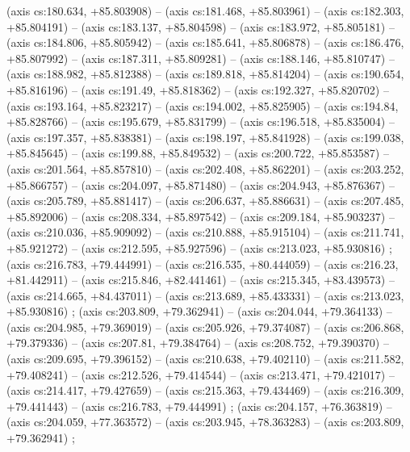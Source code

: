     (axis cs:180.634,    +85.803908) --  (axis cs:181.468,    +85.803961) --  (axis cs:182.303,    +85.804191) --  (axis cs:183.137,    +85.804598) --  (axis cs:183.972,    +85.805181) --  (axis cs:184.806,    +85.805942) --  (axis cs:185.641,    +85.806878) --  (axis cs:186.476,    +85.807992) --  (axis cs:187.311,    +85.809281) --  (axis cs:188.146,    +85.810747) --  (axis cs:188.982,    +85.812388) --  (axis cs:189.818,    +85.814204) --  (axis cs:190.654,    +85.816196) --  (axis cs:191.49,    +85.818362) --  (axis cs:192.327,    +85.820702) --  (axis cs:193.164,    +85.823217) --  (axis cs:194.002,    +85.825905) --  (axis cs:194.84,    +85.828766) --  (axis cs:195.679,    +85.831799) --  (axis cs:196.518,    +85.835004) --  (axis cs:197.357,    +85.838381) --  (axis cs:198.197,    +85.841928) --  (axis cs:199.038,    +85.845645) --  (axis cs:199.88,    +85.849532) --  (axis cs:200.722,    +85.853587) --  (axis cs:201.564,    +85.857810) --  (axis cs:202.408,    +85.862201) --  (axis cs:203.252,    +85.866757) --  (axis cs:204.097,    +85.871480) --  (axis cs:204.943,    +85.876367) --  (axis cs:205.789,    +85.881417) --  (axis cs:206.637,    +85.886631) --  (axis cs:207.485,    +85.892006) --  (axis cs:208.334,    +85.897542) --  (axis cs:209.184,    +85.903237) --  (axis cs:210.036,    +85.909092) --  (axis cs:210.888,    +85.915104) --  (axis cs:211.741,    +85.921272) --  (axis cs:212.595,    +85.927596) --  (axis cs:213.023,    +85.930816) ;
    (axis cs:216.783,    +79.444991) --  (axis cs:216.535,    +80.444059) --  (axis cs:216.23,    +81.442911) --  (axis cs:215.846,    +82.441461) --  (axis cs:215.345,    +83.439573) --  (axis cs:214.665,    +84.437011) --  (axis cs:213.689,    +85.433331) --  (axis cs:213.023,    +85.930816) ;
    (axis cs:203.809,    +79.362941) --  (axis cs:204.044,    +79.364133) --  (axis cs:204.985,    +79.369019) --  (axis cs:205.926,    +79.374087) --  (axis cs:206.868,    +79.379336) --  (axis cs:207.81,    +79.384764) --  (axis cs:208.752,    +79.390370) --  (axis cs:209.695,    +79.396152) --  (axis cs:210.638,    +79.402110) --  (axis cs:211.582,    +79.408241) --  (axis cs:212.526,    +79.414544) --  (axis cs:213.471,    +79.421017) --  (axis cs:214.417,    +79.427659) --  (axis cs:215.363,    +79.434469) --  (axis cs:216.309,    +79.441443) --  (axis cs:216.783,    +79.444991) ;
    (axis cs:204.157,    +76.363819) --  (axis cs:204.059,    +77.363572) --  (axis cs:203.945,    +78.363283) --  (axis cs:203.809,    +79.362941) ;
